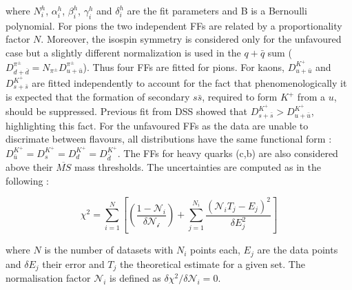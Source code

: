 where $N^h_i$, $\alpha^h_i$, $\beta^h_i$, $\gamma^h_i$ and $\delta^h_i$  are the fit parameters and B is a Bernoulli polynomial. For pions the two independent FFs are related by a proportionality factor $N$. Moreover, the isospin symmetry is considered only for the unfavoured case but a slightly different normalization is used in the $q+\bar{q}$ sum ($D^{\pi^{\pm}}_{d+\bar{d}} = N_{\pi^{\pm}} D^{\pi^{\pm}}_{u+\bar{u}}$). Thus four FFs are fitted for pions. For kaons, $D^{K^+}_{u+\bar{u}}$ and $D^{K^+}_{s+\bar{s}}$ are fitted independently to account for the fact that phenomenologically it is expected that the formation of secondary $s\bar{s}$, required to form $K^+$ from a $u$, should be suppressed. Previous fit from DSS showed that $D^{K^+}_{s+\bar{s}} > D^{K^+}_{u+\bar{u}}$, highlighting this fact. For the unfavoured FFs as the data are unable to discrimate between flavours, all distributions have the same functional form : $D^{K^+}_{\bar{u}} = D^{K^+}_{s} = D^{K^+}_{d} = D^{K^+}_{\bar{d}}$.
The FFs for heavy quarks (c,b) are also considered above their $\overline{MS}$ mass thresholds.
The uncertainties are computed as in the following :

\begin{equation}
  \chi^2 =  \sum_{i=1}^{N} \left[ \left( \frac{1-\mathscr{N}_i}{\delta\mathscr{N_i}} \right) + \sum_{j=1}^{N_i} \frac{(\mathscr{N}_i T_j - E_j)^2}{\delta E^2_j} \right]
  \label{eq:DSEHSuncert}
\end{equation}

where $N$ is the number of datasets with $N_i$ points each, $E_j$ are the data points and $\delta E_j$ their error and $T_j$ the theoretical estimate for a given set. The normalisation factor $\mathscr{N}_i$ is defined as $\delta \chi^2 / \delta\mathscr{N}_i = 0$.

